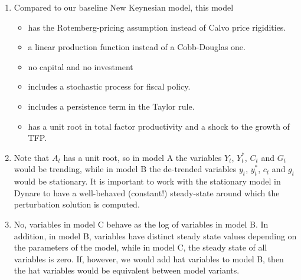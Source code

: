 \begin{enumerate}

\item Compared to our baseline New Keynesian model, this model
    \begin{itemize}
    \item has the Rotemberg-pricing assumption instead of Calvo price rigidities.
    \item a linear production function instead of a Cobb-Douglas one.
    \item no capital and no investment
    \item includes a stochastic process for fiscal policy.
    \item includes a persistence term in the Taylor rule.
    \item has a unit root in total factor productivity and a shock to the growth of TFP.
\end{itemize}
  
\item Note that $A_t$ has a unit root, so in model A the variables $Y_t$, $Y_t^*$, $C_t$ and $G_t$ would be trending,
  while in model B the de-trended variables $y_t$, $y_t^*$, $c_t$ and $g_t$ would be stationary.
It is important to work with the stationary model in Dynare to have a well-behaved (constant!) steady-state
  around which the perturbation solution is computed.

\item No, variables in model C behave as the log of variables in model B.
In addition, in model B, variables have distinct steady state values depending on the parameters of the model,
  while in model C, the steady state of all variables is zero.
If, however, we would add hat variables to model B,
  then the hat variables would be equivalent between model variants.


\end{enumerate}

